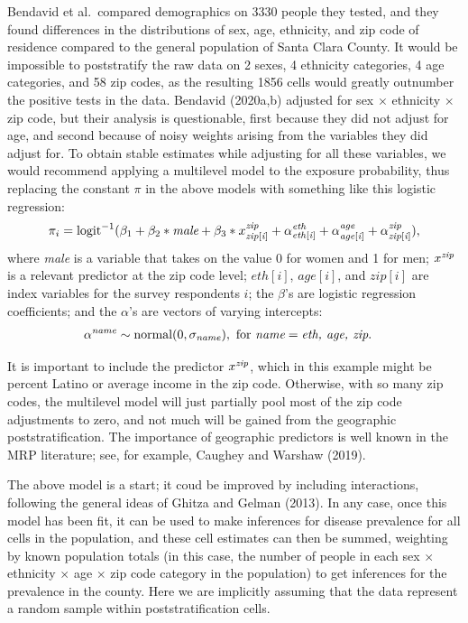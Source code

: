 \documentclass[11pt]{article}
\begin{document}
Bendavid et al.\ compared demographics on 3330 people they tested, and they found differences in the distributions of sex, age, ethnicity, and zip code of residence compared to the general population of Santa Clara County. It would be impossible to poststratify the raw data on 2 sexes, 4 ethnicity categories,  4 age categories, and 58 zip codes, as the resulting 1856 cells would greatly outnumber the positive tests in the data.  Bendavid (2020a,b) adjusted for sex $\times$ ethnicity $\times$ zip code, but their analysis is questionable, first because they did not adjust for age, and second because of noisy weights arising from the variables they did adjust for.
To obtain stable estimates while adjusting for all these variables, we would recommend applying a multilevel model to the exposure probability, thus replacing the constant $\pi$ in the above models with something like this logistic regression:
\begin{equation*}
\pi_i = \mbox{logit}^{-1}(\beta_1 + \beta_2*\mbox{\it male} + \beta_3*x^{\it zip}_{\it zip[i]} + \alpha^{\it eth}_{\it eth[i]} + \alpha^{\it age}_{\it age[i]} + \alpha^{\it zip}_{\it zip[i]}),
\end{equation*}
where {\it male} is a variable that takes on the value 0 for women and 1 for men; $x^{\it zip}$ is a relevant predictor at the zip code level; $eth[i]$, $age[i]$, and $zip[i]$ are index variables for the survey respondents $i$; the $\beta$'s are logistic regression coefficients; and the $\alpha$'s are vectors of varying intercepts:
\begin{align*}
  \alpha^{\it name} &\sim \mbox{normal}(0, \sigma_{\it name}),\mbox{ for } \mbox{\it name} = \mbox{\it eth, age, zip}.
\end{align*}

It is important to include the predictor $x^{\it zip}$, which in this example might be percent Latino or average income in the zip code.  Otherwise, with so many zip codes, the multilevel model will just partially pool most of the zip code adjustments to zero, and not much will be gained from the geographic poststratification.  The importance of geographic predictors is well known in the MRP literature; see, for example, Caughey and Warshaw (2019).

The above model is a start; it coud be improved by including interactions, following the general ideas of Ghitza and Gelman (2013).  In any case, once this model has been fit, it can be used to make inferences for disease prevalence for all cells in the population, and these cell estimates can then be summed, weighting by known population totals (in this case, the number of people in each sex $\times$ ethnicity $\times$ age $\times$ zip code category in the population) to get inferences for the prevalence in the county.  Here we are implicitly assuming that the data represent a random sample within poststratification cells.
\end{document}
